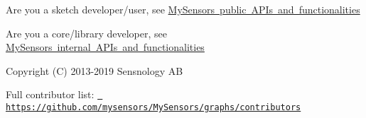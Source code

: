 Are you a sketch developer/user, see \mbox{\hyperlink{group__publics}{My\+Sensors public A\+P\+Is and functionalities}}

Are you a core/library developer, see \mbox{\hyperlink{group__internals}{My\+Sensors internal A\+P\+Is and functionalities}}

\begin{DoxyCopyright}{Copyright}
(C) 2013-\/2019 Sensnology AB
\end{DoxyCopyright}
Full contributor list\+: \href{https://github.com/mysensors/MySensors/graphs/contributors}{\texttt{ https\+://github.\+com/mysensors/\+My\+Sensors/graphs/contributors}} 